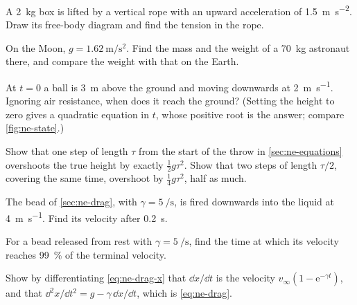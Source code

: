 \begin{exercise}[a rope]
\label{ex:ne-rope}
A \SI{2}{\kilogram} box is lifted by a vertical rope with an upward
acceleration of \SI{1.5}{\metre\per\second\squared}. Draw its free-body
diagram and find the tension in the rope.
\end{exercise}

\begin{exercise}
\label{ex:ne-moon}
On the Moon, $g = \SI{1.62}{\metre\per\second\squared}$. Find the mass
and the weight of a \SI{70}{\kilogram} astronaut there, and compare the
weight with that on the Earth.
\end{exercise}

\begin{exercise}[a state]
\label{ex:ne-state}
At $t = 0$ a ball is \SI{3}{\metre} above the ground and moving downwards
at \SI{2}{\metre\per\second}. Ignoring air resistance, when does it reach
the ground? (Setting the height to zero gives a quadratic equation in $t$,
whose positive root is the answer; compare \cref{fig:ne-state}.)
\end{exercise}

\begin{exercise}
\label{ex:ne-euler}
Show that one step of length $\tau$ from the start of the throw in
\cref{sec:ne-equations} overshoots the true height by exactly
$\tfrac12 g\tau^2$. Show that two steps of length $\tau/2$, covering the
same time, overshoot by $\tfrac14 g\tau^2$, half as much.
\end{exercise}

\begin{exercise}
\label{ex:ne-above}
The bead of \cref{sec:ne-drag}, with $\gamma = \SI{5}{\per\second}$, is
fired downwards into the liquid at \SI{4}{\metre\per\second}. Find its
velocity after \SI{0.2}{\second}.
\end{exercise}

\begin{exercise}
\label{ex:ne-approach}
For a bead released from rest with $\gamma = \SI{5}{\per\second}$, find
the time at which its velocity reaches \SI{99}{\percent} of the terminal
velocity.
\end{exercise}

\begin{exercise}
\label{ex:ne-drag-check}
Show by differentiating \cref{eq:ne-drag-x} that $\dd x/\dd t$ is the
velocity $v_\infty(1 - \mathrm{e}^{-\gamma t})$, and that $\dd^2 x/\dd
t^2 = g - \gamma\,\dd x/\dd t$, which is \cref{eq:ne-drag}.
\end{exercise}

